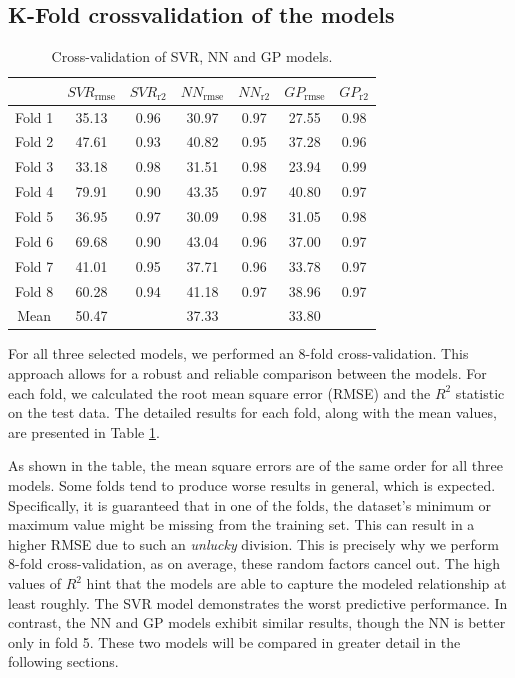 \subsection*{K-Fold crossvalidation of the models}
\begin{table}[h]
	\centering
	\begin{tabular}{ c c c c c c c }
		\toprule
		\  & $SVR_\mathrm{rmse}$& $SVR_\mathrm{r2}$ & $NN_\mathrm{rmse}$   & $NN_\mathrm{r2}$ & $GP_\mathrm{rmse}$ & $GP_\mathrm{r2}$ \\ 
		\midrule
		Fold 1 & 35.13 & 0.96 & 30.97 & 0.97 & 27.55 & 0.98 \\ 
		Fold 2 & 47.61 & 0.93 & 40.82 & 0.95 & 37.28 & 0.96 \\ 
		Fold 3 & 33.18 & 0.98 & 31.51 & 0.98 & 23.94 & 0.99 \\ 
		Fold 4 & 79.91 & 0.90 & 43.35 & 0.97 & 40.80 & 0.97 \\ 
		Fold 5 & 36.95 & 0.97 & 30.09 & 0.98 & 31.05 & 0.98 \\ 
		Fold 6 & 69.68 & 0.90 & 43.04 & 0.96 & 37.00 & 0.97 \\ 
		Fold 7 & 41.01 & 0.95 & 37.71 & 0.96 & 33.78 & 0.97 \\ 
		Fold 8 & 60.28 & 0.94 & 41.18 & 0.97 & 38.96 & 0.97 \\ 
		\midrule
		Mean & 50.47 & & 37.33 & & 33.80 & \\ 
		\bottomrule
	\end{tabular}
	\caption{Cross-validation of SVR, NN and GP models.} 
	\label{tab:cross-val} 
\end{table}

For all three selected models, we performed an 8-fold cross-validation. This approach allows for a robust and reliable comparison between the models. For each fold, we calculated the root mean square error (RMSE) and the $R^2$ statistic on the test data. The detailed results for each fold, along with the mean values, are presented in Table \ref{tab:cross-val}.

As shown in the table, the mean square errors are of the same order for all three models. Some folds tend to produce worse results in general, which is expected. Specifically, it is guaranteed that in one of the folds, the dataset's minimum or maximum value might be missing from the training set. This can result in a higher RMSE due to such an \textit{unlucky} division. This is precisely why we perform 8-fold cross-validation, as on average, these random factors cancel out. The high values of $R^2$ hint that the models are able to capture the modeled relationship at least roughly. The SVR model demonstrates the worst predictive performance. In contrast, the NN and GP models exhibit similar results, though the NN is better only in fold 5. These two models will be compared in greater detail in the following sections.


